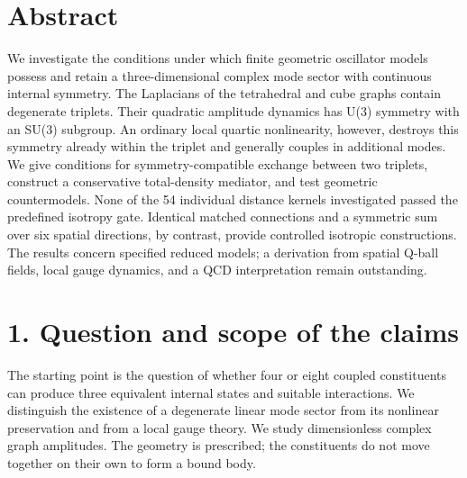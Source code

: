 \documentclass[a4paper,11pt]{article}
\begin{document}
\begin{flushleft}
Not peer reviewed \textperiodcentered\ Authorship and publication version remain to be determined\\
English translation of version 0.5}

\vspace{1em}
{\LARGE\bfseries Geometric mode triplets and symmetry-compatible interactions\par}
\vspace{0.7em}
{\bfseries Analytical constructions, numerical cross-checks, and limits of an SU(3) interpretation}
\end{flushleft}

\section*{Abstract}
We investigate the conditions under which finite geometric oscillator models possess and retain a three-dimensional complex mode sector with continuous internal symmetry. The Laplacians of the tetrahedral and cube graphs contain degenerate triplets. Their quadratic amplitude dynamics has U(3) symmetry with an SU(3) subgroup. An ordinary local quartic nonlinearity, however, destroys this symmetry already within the triplet and generally couples in additional modes. We give conditions for symmetry-compatible exchange between two triplets, construct a conservative total-density mediator, and test geometric countermodels. None of the 54 individual distance kernels investigated passed the predefined isotropy gate. Identical matched connections and a symmetric sum over six spatial directions, by contrast, provide controlled isotropic constructions. The results concern specified reduced models; a derivation from spatial Q-ball fields, local gauge dynamics, and a QCD interpretation remain outstanding.

\section*{1. Question and scope of the claims}
The starting point is the question of whether four or eight coupled constituents can produce three equivalent internal states and suitable interactions. We distinguish the existence of a degenerate linear mode sector from its nonlinear preservation and from a local gauge theory. We study dimensionless complex graph amplitudes. The geometry is prescribed; the constituents do not move together on their own to form a bound body.
\end{document}
